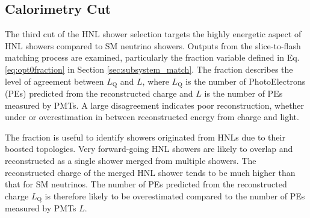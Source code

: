 \subsection{Calorimetry Cut}
\label{sec:calo_cut}

The third cut of the HNL shower selection targets the highly energetic aspect of HNL showers compared to SM neutrino showers.
Outputs from the slice-to-flash matching process are examined, particularly the fraction variable defined in Eq. \ref{eq:opt0fraction} in Section \ref{sec:subsystem_match}.
The fraction describes the level of agreement between $L_{\mathrm{Q}}$ and $L$, where $L_\mathrm{Q}$ is the number of PhotoElectrons (PEs) predicted from the reconstructed charge and $L$ is the number of PEs measured by PMTs.
A large disagreement indicates poor reconstruction, whether under or overestimation in between reconstructed energy from charge and light.

The fraction is useful to identify showers originated from HNLs due to their boosted topologies.
Very forward-going HNL showers are likely to overlap and reconstructed as a single shower merged from multiple showers.   
The reconstructed charge of the merged HNL shower tends to be much higher than that for SM neutrinos.
The number of PEs predicted from the reconstructed charge $L_{\mathrm{Q}}$ is therefore likely to be overestimated compared to the number of PEs measured by PMTs $L$.

